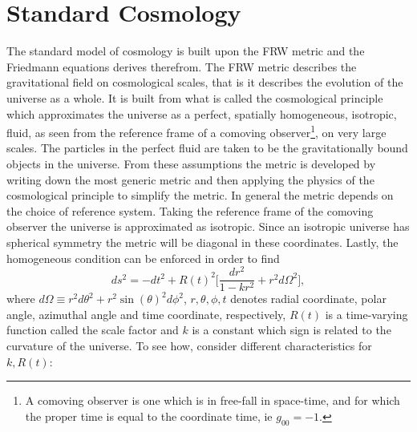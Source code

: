 \section{Standard Cosmology}
\label{SC}
The standard model of cosmology is built upon the FRW metric and the Friedmann equations derives therefrom. The FRW metric describes the gravitational field on cosmological scales, that is it describes the evolution of the universe as a whole. It is built from what is called the cosmological principle which approximates the universe as a perfect, spatially homogeneous, isotropic, fluid, as seen from the reference frame of a comoving observer\footnote{A comoving observer is one which is in free-fall in space-time, and for which the proper time is equal to the coordinate time, ie $g_{00}=-1$.}, on very large scales. The particles in the perfect fluid are taken to be the gravitationally bound objects in the universe. From these assumptions the metric is developed by writing down the most generic metric and then applying the physics of the cosmological principle to simplify the metric. \newline 
In general the metric depends on the choice of reference system. Taking the reference frame of the comoving observer the universe is approximated as isotropic. Since an isotropic universe has spherical symmetry the metric will be diagonal in these coordinates. Lastly, the homogeneous condition can be enforced in order to find~\citep{Weinberg1972}
\begin{equation}
	ds^2=-dt^2+R(t)^2\bigg[\frac{dr^2}{1-kr^2}+r^2d\Omega^2\bigg],
	\label{FRW}
\end{equation}  
where $d\Omega\equiv r^2d\theta^2+r^2\sin(\theta)^2d\phi^2$, $r,\theta,\phi, t$ denotes radial coordinate, polar angle, azimuthal angle and time coordinate, respectively, $R(t)$ is a time-varying function called the scale factor and $k$ is a constant which sign is related to the curvature of the universe. To see how, consider different characteristics for $k, R(t)$:
